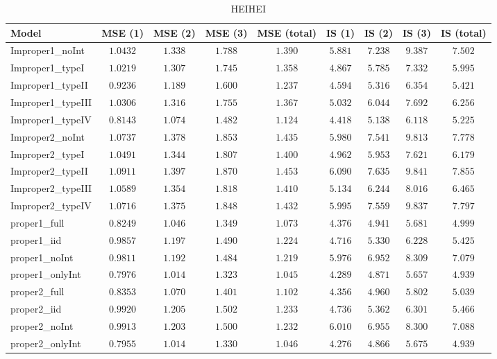 \begin{table}

\caption{\label{tab:model-choice-sc4}HEIHEI}
\centering
\begin{tabular}{lcccccccc}
\hline
Model  & MSE (1) & MSE (2) & MSE (3) & MSE (total) & IS (1) & IS (2) & IS (3) & \multicolumn{1}{c}{IS (total)} \\ 
\hline
Improper1_noInt  & $1.0432$ & $1.338$ & $1.788$ & $1.390$ & $5.881$ & $7.238$ & $9.387$ & $7.502$ \\
Improper1_typeI  & $1.0219$ & $1.307$ & $1.745$ & $1.358$ & $4.867$ & $5.785$ & $7.332$ & $5.995$ \\
Improper1_typeII  & $0.9236$ & $1.189$ & $1.600$ & $1.237$ & $4.594$ & $5.316$ & $6.354$ & $5.421$ \\
Improper1_typeIII  & $1.0306$ & $1.316$ & $1.755$ & $1.367$ & $5.032$ & $6.044$ & $7.692$ & $6.256$ \\
Improper1_typeIV  & $0.8143$ & $1.074$ & $1.482$ & $1.124$ & $4.418$ & $5.138$ & $6.118$ & $5.225$ \\
Improper2_noInt  & $1.0737$ & $1.378$ & $1.853$ & $1.435$ & $5.980$ & $7.541$ & $9.813$ & $7.778$ \\
Improper2_typeI  & $1.0491$ & $1.344$ & $1.807$ & $1.400$ & $4.962$ & $5.953$ & $7.621$ & $6.179$ \\
Improper2_typeII  & $1.0911$ & $1.397$ & $1.870$ & $1.453$ & $6.090$ & $7.635$ & $9.841$ & $7.855$ \\
Improper2_typeIII  & $1.0589$ & $1.354$ & $1.818$ & $1.410$ & $5.134$ & $6.244$ & $8.016$ & $6.465$ \\
Improper2_typeIV  & $1.0716$ & $1.375$ & $1.848$ & $1.432$ & $5.995$ & $7.559$ & $9.837$ & $7.797$ \\
proper1_full  & $0.8249$ & $1.046$ & $1.349$ & $1.073$ & $4.376$ & $4.941$ & $5.681$ & $4.999$ \\
proper1_iid  & $0.9857$ & $1.197$ & $1.490$ & $1.224$ & $4.716$ & $5.330$ & $6.228$ & $5.425$ \\
proper1_noInt  & $0.9811$ & $1.192$ & $1.484$ & $1.219$ & $5.976$ & $6.952$ & $8.309$ & $7.079$ \\
proper1_onlyInt  & $0.7976$ & $1.014$ & $1.323$ & $1.045$ & $4.289$ & $4.871$ & $5.657$ & $4.939$ \\
proper2_full  & $0.8353$ & $1.070$ & $1.401$ & $1.102$ & $4.356$ & $4.960$ & $5.802$ & $5.039$ \\
proper2_iid  & $0.9920$ & $1.205$ & $1.502$ & $1.233$ & $4.736$ & $5.362$ & $6.301$ & $5.466$ \\
proper2_noInt  & $0.9913$ & $1.203$ & $1.500$ & $1.232$ & $6.010$ & $6.955$ & $8.300$ & $7.088$ \\
proper2_onlyInt  & $0.7955$ & $1.014$ & $1.330$ & $1.046$ & $4.276$ & $4.866$ & $5.675$ & $4.939$ \\
\hline 
\end{tabular}

\end{table}